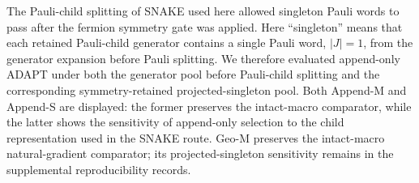 \documentclass[
  reprint,
  amsmath,
  amssymb,
  aps,
  pra,
  nofootinbib,
  superscriptaddress,
  floatfix
]{revtex4-2}
\begin{document}
The Pauli-child splitting of SNAKE used here allowed singleton Pauli words to pass after the fermion symmetry gate was applied. Here ``singleton'' means that each retained Pauli-child generator contains a single Pauli word, \(|J|=1\), from the generator expansion before Pauli splitting. We therefore evaluated append-only ADAPT under both the generator pool before Pauli-child splitting and the corresponding symmetry-retained projected-singleton pool. Both Append-M and Append-S are displayed: the former preserves the intact-macro comparator, while the latter shows the sensitivity of append-only selection to the child representation used in the SNAKE route. Geo-M preserves the intact-macro natural-gradient comparator; its projected-singleton sensitivity remains in the supplemental reproducibility records.

\end{document}
